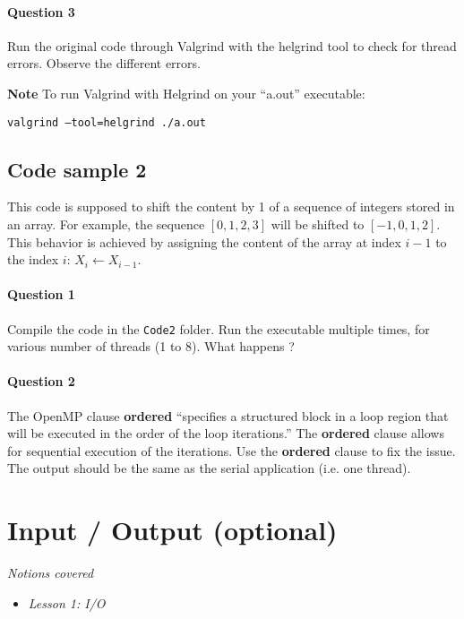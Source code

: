 \documentclass[letterpaper,10pt]{article}
\begin{document}
\paragraph{Question 3} Run the original code through Valgrind with the helgrind tool to check for thread errors. Observe the different errors.
\newline

\textbf{Note} To run Valgrind with Helgrind on your ``a.out'' executable: 
\begin{center}
 \texttt{valgrind --tool=helgrind ./a.out}
\end{center}



\subsection{Code sample 2}
This code is supposed to shift the content by 1 of a sequence of integers stored in an array. For example, the sequence $[0,1,2,3]$ will be shifted to $[-1,0,1,2]$. This behavior
is achieved by assigning the content of the array at index $i-1$ to the index $i$: $X_{i} \leftarrow X_{i-1}$. 
\paragraph{Question 1} Compile the code in the \texttt{Code2} folder. Run the executable multiple times, for various number of threads (1 to 8). What happens ? 
\newline



\paragraph{Question 2} The OpenMP clause \textbf{ordered} ``specifies a structured block in a loop region that will be executed in the order of the loop iterations.''  The \textbf{ordered} clause allows
for sequential execution of the iterations. Use the \textbf{ordered} clause to fix the issue. The output should be the same as the serial application (i.e. one thread).


\newpage

\section{Input / Output (optional)}
\textit{Notions covered}
\begin{itemize}
 \item \textit{Lesson 1: I/O}
\end{itemize}
\end{document}
